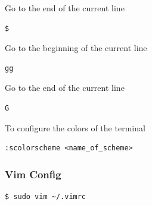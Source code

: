\documentclass{article}
\newenvironment{codetemplate}[1][]{%
  \mybasecolorbox[#1]
  \itshape
}{%
  \endmybasecolorbox
}
\begin{document}
Go to the end of the current line
\begin{codetemplate}
\begin{verbatim}
$
\end{verbatim}
\end{codetemplate}

Go to the beginning of the current line
\begin{codetemplate}
\begin{verbatim}
gg
\end{verbatim}
\end{codetemplate}

Go to the end of the current line
\begin{codetemplate}
\begin{verbatim}
G
\end{verbatim}
\end{codetemplate}

To configure the colors of the terminal
\begin{codetemplate}
\begin{verbatim}
:scolorscheme <name_of_scheme>
\end{verbatim}
\end{codetemplate}

\subsubsection{Vim Config}

\begin{codetemplate}{}
\begin{verbatim}
$ sudo vim ~/.vimrc
\end{verbatim}
\end{codetemplate}
\end{document}
